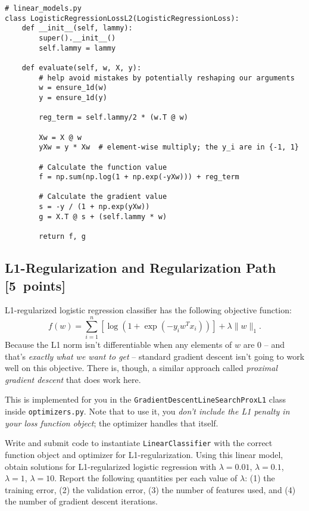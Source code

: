 \documentclass{article}
\newenvironment{asking}{\begingroup\color{blu}}{\endgroup}
\newcommand\pts[1]{\textcolor{pointscolour}{[#1~points]}}
\newcommand{\norm}[1]{\lVert #1 \rVert}
\begin{document}
\begin{verbatim}
# linear_models.py
class LogisticRegressionLossL2(LogisticRegressionLoss):
    def __init__(self, lammy):
        super().__init__()
        self.lammy = lammy

    def evaluate(self, w, X, y):
        # help avoid mistakes by potentially reshaping our arguments
        w = ensure_1d(w)
        y = ensure_1d(y)

        reg_term = self.lammy/2 * (w.T @ w)

        Xw = X @ w
        yXw = y * Xw  # element-wise multiply; the y_i are in {-1, 1}

        # Calculate the function value
        f = np.sum(np.log(1 + np.exp(-yXw))) + reg_term

        # Calculate the gradient value
        s = -y / (1 + np.exp(yXw))
        g = X.T @ s + (self.lammy * w)

        return f, g

\end{verbatim}
\newpage

\subsection{L1-Regularization and Regularization Path \pts{5}}
L1-regularized logistic regression classifier has the following objective function:
\[
f(w) = \sum_{i=1}^n \left[\log(1+\exp(-y_iw^Tx_i))\right] + \lambda\norm{w}_1.
\]
Because the L1 norm isn't differentiable when any elements of $w$ are $0$ -- and that's \emph{exactly what we want to get} -- standard gradient descent isn't going to work well on this objective.
There is, though, a similar approach called \emph{proximal gradient descent} that does work here.

This is implemented for you in the \verb|GradientDescentLineSearchProxL1| class inside \verb|optimizers.py|.
Note that to use it, you \emph{don't include the L1 penalty in your loss function object};
the optimizer handles that itself.

\begin{asking}Write and submit code to instantiate \verb|LinearClassifier| with the correct function object and optimizer for L1-regularization. Using this linear model, obtain solutions for L1-regularized logistic regression with $\lambda = 0.01$, $\lambda = 0.1$, $\lambda = 1$, $\lambda = 10$. Report the following quantities per each value of $\lambda$: (1) the training error, (2) the validation error, (3) the number of features used, and (4) the number of gradient descent iterations.\end{asking}
\end{document}
